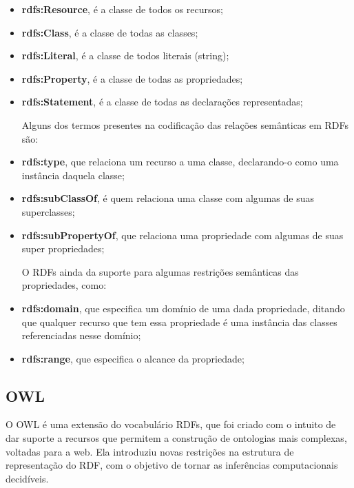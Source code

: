 \begin{itemize}
    \item \textbf{rdfs:Resource}, é a classe de todos os recursos;

    \item \textbf{rdfs:Class}, é a classe de todas as classes;

    \item \textbf{rdfs:Literal}, é a classe de todos literais (string);

    \item \textbf{rdfs:Property}, é a classe de todas as propriedades;

    \item \textbf{rdfs:Statement}, é a classe de todas as declarações
    representadas;

    Alguns dos termos presentes na codificação das relações semânticas em RDFs
    são:

    \item \textbf{rdfs:type}, que relaciona um recurso a uma classe, declarando-o
    como uma instância daquela classe;

    \item \textbf{rdfs:subClassOf}, é quem relaciona uma classe com algumas de
    suas superclasses;

    \item \textbf{rdfs:subPropertyOf}, que relaciona uma propriedade com algumas
    de suas super propriedades;

    O RDFs ainda da suporte para algumas restrições semânticas das propriedades,
    como:

    \item \textbf{rdfs:domain}, que especifica um domínio de uma dada propriedade,
    ditando que qualquer recurso que tem essa propriedade é uma instância das
    classes referenciadas nesse domínio;

    \item \textbf{rdfs:range}, que especifica o alcance da propriedade;
\end{itemize}


\subsection{OWL}
\label{sec:owl}

O OWL é uma extensão do vocabulário RDFs, que foi criado com o intuito de dar
suporte a recursos que permitem a construção de ontologias mais complexas, voltadas
para a web. Ela introduziu novas restrições na estrutura de representação do RDF,
com o objetivo de tornar as inferências computacionais decidíveis.

